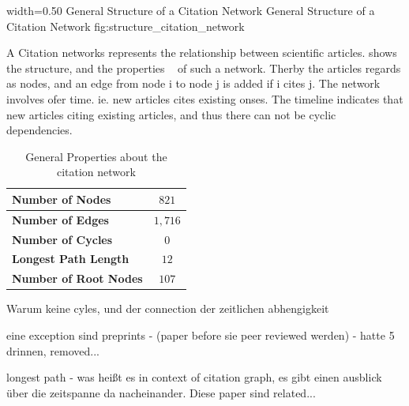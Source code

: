       {width=0.50\textwidth}
      {General Structure of a Citation Network}
      {General Structure of a Citation Network}
      {fig:structure_citation_network}

A Citation networks represents the relationship between scientific articles.  shows the structure, and the properties ~\cite{kas2011} of such a network. Therby the articles regards as nodes, and an edge from node i to node j is added if i cites j. The network involves ofer time. ie. new articles cites existing onses. The timeline indicates that new articles citing existing articles, and thus there can not be cyclic dependencies.

\begin{table}[!b]
  \centering
  \begin{tabular}{ l c }
    \toprule
    \textbf{Number of Nodes}      & $821$  \\ \midrule
    \textbf{Number of Edges}      & $1,716$ \\ \midrule
    \textbf{Number of Cycles}     & $0$    \\ \midrule
    \textbf{Longest Path Length}  & $12$   \\ \midrule
    \textbf{Number of Root Nodes} & $107$  \\
    \bottomrule
  \end{tabular}
  \caption[General Properties about the citation network]{General Properties about the citation network}
  \label{tbl:general_properties_about_the_graph}
\end{table}

Warum keine cyles, und der connection der zeitlichen abhengigkeit

eine exception sind preprints - (paper before sie peer reviewed werden) - hatte 5 drinnen, removed...

longest path - was heißt es in context of citation graph, es gibt einen ausblick über die zeitspanne da nacheinander. Diese paper sind related...

